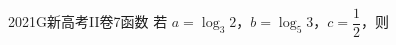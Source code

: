 
\begin{problem}{2021}{G}{新高考II卷}{7}{函数}
若 $ a=\log_{3}2 $，$ b=\log_{5}3 $，$ c=\dfrac{1}{2} $，则
\begin{choices}
\end{choices}
\end{problem}

\begin{answer}

\end{answer}

\begin{solutions}

\end{solutions}